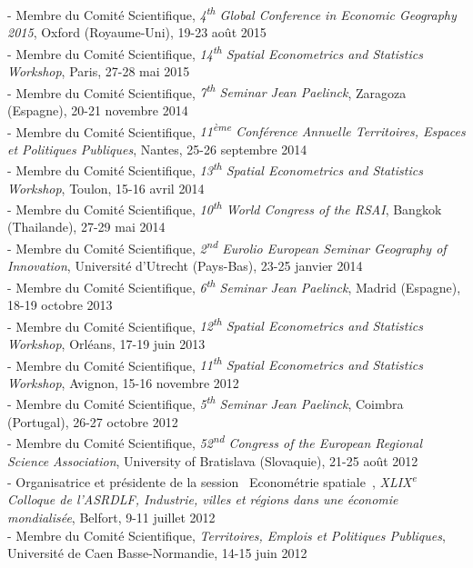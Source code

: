 \documentclass[a4paper,12pt]{article}
\begin{document}
- Membre du Comité Scientifique, \textit{4\textsuperscript{th} Global Conference in Economic Geography 2015}, Oxford (Royaume-Uni), 19-23 août 2015\\
- Membre du Comité Scientifique, \textit{14\textsuperscript{th} Spatial Econometrics and Statistics Workshop}, Paris, 27-28 mai 2015\\
- Membre du Comité Scientifique, \textit{7\textsuperscript{th} Seminar Jean Paelinck}, Zaragoza (Espagne), 20-21 novembre 2014\\
- Membre du Comité Scientifique, \textit{11\textsuperscript{ème} Conférence Annuelle Territoires, Espaces et Politiques Publiques}, Nantes, 25-26 septembre 2014\\
- Membre du Comité Scientifique, \textit{13\textsuperscript{th} Spatial Econometrics and Statistics Workshop}, Toulon, 15-16 avril 2014\\
- Membre du Comité Scientifique, \textit{10\textsuperscript{th} World Congress of the RSAI}, Bangkok (Thailande), 27-29 mai 2014\\
- Membre du Comité Scientifique, \textit{2\textsuperscript{nd} Eurolio European Seminar Geography of Innovation}, Université d'Utrecht (Pays-Bas), 23-25 janvier 2014\\
- Membre du Comité Scientifique, \textit{6\textsuperscript{th} Seminar Jean Paelinck}, Madrid (Espagne), 18-19 octobre 2013 \\
- Membre du Comité Scientifique, \textit{12\textsuperscript{th} Spatial Econometrics and Statistics Workshop}, Orléans, 17-19 juin 2013\\
- Membre du Comité Scientifique, \textit{11\textsuperscript{th} Spatial Econometrics and Statistics Workshop}, Avignon, 15-16 novembre 2012\\
- Membre du Comité Scientifique, \textit{5\textsuperscript{th} Seminar Jean Paelinck}, Coimbra (Portugal), 26-27 octobre 2012\\
- Membre du Comité Scientifique, \textit{52\textsuperscript{nd} Congress of the European Regional Science Association}, University of Bratislava (Slovaquie), 21-25 août 2012\\
- Organisatrice et présidente de la session \og~Econométrie spatiale~\fg, \textit{XLIX\textsuperscript{e} Colloque de l'ASRDLF, Industrie, villes et régions dans une économie mondialisée}, Belfort, 9-11 juillet 2012\\
- Membre du Comité Scientifique, \textit{Territoires, Emplois et Politiques Publiques}, Université de Caen Basse-Normandie, 14-15 juin 2012\\
\end{document}
